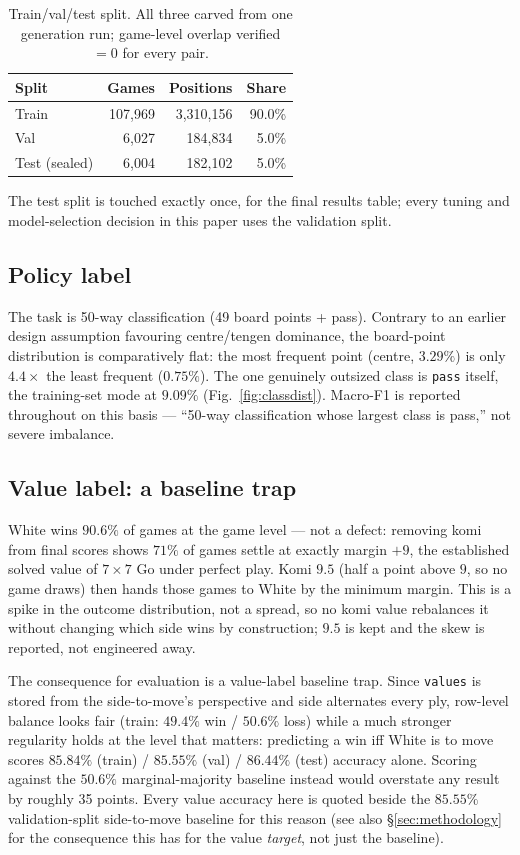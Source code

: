 \documentclass[conference,a4paper]{IEEEtran}
\begin{document}
\begin{table}[t]
\centering
\caption{Train/val/test split. All three carved from one generation run;
game-level overlap verified $=0$ for every pair.}
\label{tab:splits}
\begin{tabular}{lrrr}
\toprule
Split & Games & Positions & Share \\
\midrule
Train & 107{,}969 & 3{,}310{,}156 & 90.0\% \\
Val & 6{,}027 & 184{,}834 & 5.0\% \\
Test (sealed) & 6{,}004 & 182{,}102 & 5.0\% \\
\bottomrule
\end{tabular}
\end{table}

The test split is touched exactly once, for the final results table; every
tuning and model-selection decision in this paper uses the validation
split.

\subsection{Policy label}
The task is 50-way classification (49 board points + pass). Contrary to an
earlier design assumption favouring centre/tengen dominance, the board-point
distribution is comparatively flat: the most frequent point (centre,
$3.29\%$) is only $4.4\times$ the least frequent ($0.75\%$). The one
genuinely outsized class is \texttt{pass} itself, the training-set mode at
$9.09\%$ (Fig.~\ref{fig:classdist}). Macro-F1 is reported throughout on this
basis --- ``50-way classification whose largest class is pass,'' not severe
imbalance.

\subsection{Value label: a baseline trap}
\label{sec:valuetrap}
White wins $90.6\%$ of games at the game level --- not a defect: removing
komi from final scores shows $71\%$ of games settle at exactly margin $+9$,
the established solved value of $7\times7$ Go under perfect play. Komi
$9.5$ (half a point above $9$, so no game draws) then hands those games to
White by the minimum margin. This is a spike in the outcome distribution,
not a spread, so no komi value rebalances it without changing which side
wins by construction; $9.5$ is kept and the skew is reported, not engineered
away.

The consequence for evaluation is a value-label baseline trap. Since
\texttt{values} is stored from the side-to-move's perspective and side
alternates every ply, row-level balance looks fair (train: $49.4\%$ win /
$50.6\%$ loss) while a much stronger regularity holds at the level that
matters: predicting a win iff White is to move scores $85.84\%$ (train) /
$85.55\%$ (val) / $86.44\%$ (test) accuracy alone. Scoring against the
$50.6\%$ marginal-majority baseline instead would overstate any result by
roughly 35 points. Every value accuracy here is quoted beside the $85.55\%$
validation-split side-to-move
baseline for this reason (see also \S\ref{sec:methodology} for the
consequence this has for the value \emph{target}, not just the baseline).
\end{document}

